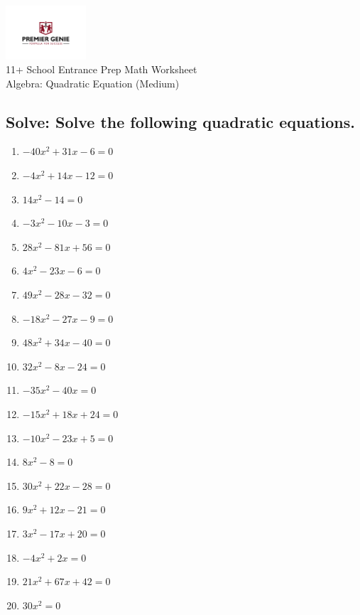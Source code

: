\documentclass{article}
\begin{document}
\begin{center}
\includegraphics[width=3cm]{PREMGENIEJPG.jpg}\\
{\Large 11+ School Entrance Prep Math Worksheet}\\
{\Medium Algebra: Quadratic Equation (Medium)}\\

\end{center}

\subsection*{Solve: Solve the following quadratic equations.}

\begin{enumerate}
\item $\displaystyle - 40 x^{2} + 31 x - 6 = 0 $ \ 
\item $\displaystyle - 4 x^{2} + 14 x - 12 = 0 $ \ 
\item $\displaystyle 14 x^{2} - 14 = 0 $ \ 
\item $\displaystyle - 3 x^{2} - 10 x - 3 = 0 $ \ 
\item $\displaystyle 28 x^{2} - 81 x + 56 = 0 $ \ 
\item $\displaystyle 4 x^{2} - 23 x - 6 = 0 $ \ 
\item $\displaystyle 49 x^{2} - 28 x - 32 = 0 $ \ 
\item $\displaystyle - 18 x^{2} - 27 x - 9 = 0 $ \ 
\item $\displaystyle 48 x^{2} + 34 x - 40 = 0 $ \ 
\item $\displaystyle 32 x^{2} - 8 x - 24 = 0 $ \ 
\item $\displaystyle - 35 x^{2} - 40 x = 0 $ \ 
\item $\displaystyle - 15 x^{2} + 18 x + 24 = 0 $ \ 
\item $\displaystyle - 10 x^{2} - 23 x + 5 = 0 $ \ 
\item $\displaystyle 8 x^{2} - 8 = 0 $ \ 
\item $\displaystyle 30 x^{2} + 22 x - 28 = 0 $ \ 
\item $\displaystyle 9 x^{2} + 12 x - 21 = 0 $ \ 
\item $\displaystyle 3 x^{2} - 17 x + 20 = 0 $ \ 
\item $\displaystyle - 4 x^{2} + 2 x = 0 $ \ 
\item $\displaystyle 21 x^{2} + 67 x + 42 = 0 $ \ 
\item $\displaystyle 30 x^{2} = 0 $ \ 


\end{enumerate}
\end{document}
